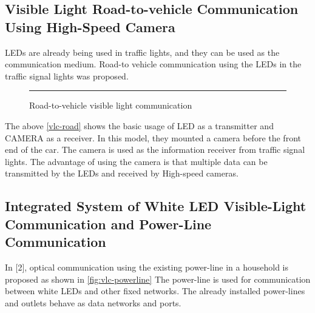 \subsection{Visible Light Road-to-vehicle Communication Using High-Speed Camera}

LEDs are already being used in traffic lights, and they can be used as the communication
medium. Road-to vehicle communication using the LEDs in the traffic signal lights was
proposed.

\begin{figure}[htbp]
  \centering
    \rule{35em}{0.5pt}
  \caption[Road-to-vehicle visible light communication]{Road-to-vehicle visible light communication}
  \label{fig:vlc-road}
\end{figure}

The above \ref{vlc-road} shows the basic usage of LED as a transmitter and CAMERA as a
receiver. In this model, they mounted a camera before the front end of the car. The
camera is used as the information receiver from traffic signal lights. The advantage of
using the camera is that multiple data can be transmitted by the LEDs and received by
High-speed cameras. 


\subsection{Integrated System of White LED Visible-Light Communication and Power-Line Communication}

In [2], optical communication using the existing power-line in a household is proposed as
shown in \ref{fig:vlc-powerline}
The power-line is used for communication between white LEDs and other fixed
networks. The already installed power-lines and outlets behave as data networks and
ports.

